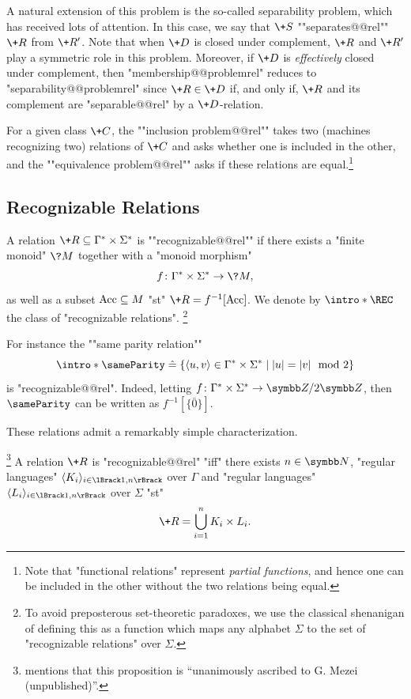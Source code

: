 A natural extension of this problem is the so-called separability problem,
which has received lots of attention.
In this case, we say that $\+S$ ""separates@@rel"" $\+R$ from $\+R'$.
Note that when $\+D$ is closed under complement, $\+R$ and $\+R'$ play a symmetric role in this problem. Moreover, if $\+D$ is \emph{effectively} closed under complement,
then "membership@@problemrel" reduces to "separability@@problemrel" 
since $\+R \in \+D$ if, and only if, $\+R$ and its complement are "separable@@rel" by
a $\+D$-relation.

For a given class $\+C$, the \AP""inclusion problem@@rel"" takes two (machines recognizing two) 
relations of $\+C$ and asks whether one is included in the other, and the \AP""equivalence 
problem@@rel"" asks if these relations are equal.\footnote{Note that "functional relations"
represent \emph{partial functions}, and hence one can be included in the other without the
two relations being equal.}



\subsection{Recognizable Relations}

A relation $\+R \subseteq \Gamma^* \times \Sigma^*$ is \AP""recognizable@@rel""
if there exists a "finite monoid" $\?M$ together with a "monoid morphism"
\[
	f\colon \Gamma^* \times \Sigma^* \to \?M,
\]
as well as a subset $\textrm{Acc} \subseteq M$ "st"
$\+R = f^{-1}[\Acc]$. We denote by \AP$\intro*\REC$ the class of "recognizable relations".%
\footnote{To avoid preposterous set-theoretic paradoxes, 
we use the classical shenanigan of defining this as a function which maps
any alphabet $\Sigma$ to the set of "recognizable relations" over $\Sigma$.}

For instance the \AP""same parity relation""
\[
	{\intro*\sameParity} \defeq 
	\{
		\tup{u,v} \in \Gamma^* \times \Sigma^* \mid
		|u| = |v| \mod{2}
	\}
\]
is "recognizable@@rel". Indeed, letting $f\colon  \Gamma^* \times \Sigma^* \to \ZnZ{2}$,
then $\sameParity$ can be written as $f^{-1}[\{\bar 0\}]$.

These relations admit a remarkably simple characterization.\AP
\begin{proposition}
	\!\footnote{\cite[\S~2, ``Notes \& references'']{Sakarovitch2009Elements} mentions
	that this proposition is ``unanimously ascribed to G. Mezei (unpublished)''.}
	\label{prop:Mezei-theorem}
	A relation $\+R$ is "recognizable@@rel" "iff" there exists $n\in\N$,
	"regular languages" $\tup{K_i}_{i\in \lBrack 1,n\rBrack}$ over $\Gamma$
	and "regular languages" $\tup{L_i}_{i\in \lBrack 1,n\rBrack}$ over $\Sigma$
	"st"
	\[
		\+R = \bigcup_{i=1}^n K_i \times L_i.
	\]
\end{proposition}

